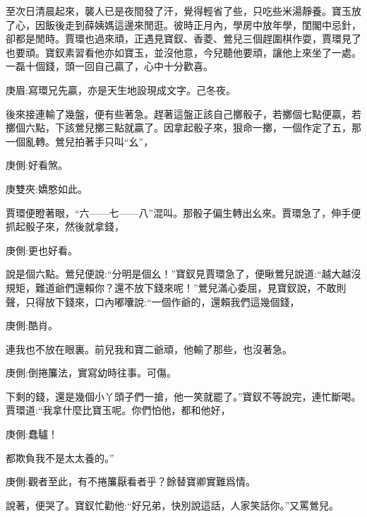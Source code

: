 \begin{parag}
    至次日清晨起來，襲人已是夜間發了汗，覺得輕省了些，只吃些米湯靜養。寶玉放了心，因飯後走到薛姨媽這邊來閒逛。彼時正月內，學房中放年學，閨閣中忌針，卻都是閒時。賈環也過來頑，正遇見寶釵、香菱、鶯兒三個趕圍棋作耍，賈環見了也要頑。寶釵素習看他亦如寶玉，並沒他意，今兒聽他要頑，讓他上來坐了一處。一磊十個錢，頭一回自己贏了，心中十分歡喜。\begin{note}庚眉:寫環兄先贏，亦是天生地設現成文字。己冬夜。\end{note}後來接連輸了幾盤，便有些著急。趕著這盤正該自己擲骰子，若擲個七點便贏，若擲個六點，下該鶯兒擲三點就贏了。因拿起骰子來，狠命一擲，一個作定了五，那一個亂轉。鶯兒拍著手只叫“幺”，\begin{note}庚側:好看煞。\end{note}\begin{note}庚雙夾:嬌憨如此。\end{note}賈環便瞪著眼，“六——七——八”混叫。那骰子偏生轉出幺來。賈環急了，伸手便抓起骰子來，然後就拿錢，\begin{note}庚側:更也好看。\end{note}說是個六點。鶯兒便說:“分明是個幺！”寶釵見賈環急了，便瞅鶯兒說道:“越大越沒規矩，難道爺們還賴你？還不放下錢來呢！”鶯兒滿心委屈，見寶釵說，不敢則聲，只得放下錢來，口內嘟囔說:“一個作爺的，還賴我們這幾個錢，\begin{note}庚側:酷肖。\end{note}連我也不放在眼裏。前兒我和寶二爺頑，他輸了那些，也沒著急。\begin{note}庚側:倒捲簾法，實寫幼時往事。可傷。\end{note}下剩的錢，還是幾個小丫頭子們一搶，他一笑就罷了。”寶釵不等說完，連忙斷喝。賈環道:“我拿什麼比寶玉呢。你們怕他，都和他好，\begin{note}庚側:蠢驢！\end{note}都欺負我不是太太養的。”\begin{note}庚側:觀者至此，有不捲簾厭看者乎？餘替寶卿實難爲情。\end{note}說著，便哭了。寶釵忙勸他:“好兄弟，快別說這話，人家笑話你。”又罵鶯兒。
\end{parag}


